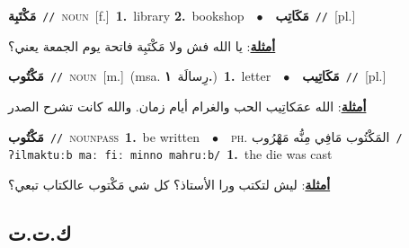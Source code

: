\documentclass[10pt,a4paper,twoside]{article} %
\begin{document}
\begin{multicols}{2}
{\setlength\topsep{0pt}\textbf{\foreignlanguage{arabic}{مَكْتَبِة}}\ {\color{gray}\texttt{//}\color{black}}\ \textsc{noun}\ [f.]\ \textbf{1.}~library  \textbf{2.}~bookshop\ \ $\bullet$\ \ \setlength\topsep{0pt}\textbf{\foreignlanguage{arabic}{مَكَاتِب}}\ {\color{gray}\texttt{//}\color{black}}\ [pl.]\  \begin{flushright}\color{gray}\foreignlanguage{arabic}{\textbf{\underline{\foreignlanguage{arabic}{أمثلة}}}: يا الله فش ولا مَكْتَبِة فاتحة يوم الجمعة يعني؟}\end{flushright}\color{black}} \vspace{2mm}

{\setlength\topsep{0pt}\textbf{\foreignlanguage{arabic}{مَكْتُوب}}\ {\color{gray}\texttt{//}\color{black}}\ \textsc{noun}\ [m.]\ \color{gray}(msa. \foreignlanguage{arabic}{رِسالَة}~\foreignlanguage{arabic}{\textbf{١.}})\color{black}\ \textbf{1.}~letter\ \ $\bullet$\ \ \setlength\topsep{0pt}\textbf{\foreignlanguage{arabic}{مَكَاتِيب}}\ {\color{gray}\texttt{//}\color{black}}\ [pl.]\  \begin{flushright}\color{gray}\foreignlanguage{arabic}{\textbf{\underline{\foreignlanguage{arabic}{أمثلة}}}: الله عمَكاتِيب الحب والغرام أيام زمان. والله كانت تشرح الصدر}\end{flushright}\color{black}} \vspace{2mm}

{\setlength\topsep{0pt}\textbf{\foreignlanguage{arabic}{مَكْتُوب}}\ {\color{gray}\texttt{//}\color{black}}\ \textsc{noun\textunderscore pass}\ \textbf{1.}~be written\ \ $\bullet$\ \ \textsc{ph.} \color{gray} \foreignlanguage{arabic}{المَكْتُوب مَافِي مِنُّه مَهْرُوب}\color{black}\ {\color{gray}\texttt{/{\sffamily ʔilmaktuːb maː fiː minno mahruːb}/}\color{black}}\ \textbf{1.}~the die was cast\  \begin{flushright}\color{gray}\foreignlanguage{arabic}{\textbf{\underline{\foreignlanguage{arabic}{أمثلة}}}: ليش لتكتب ورا الأستاذ؟ كل شي مَكْتوب عالكتاب تبعي؟}\end{flushright}\color{black}} \vspace{2mm}

\vspace{-3mm}
\subsection*{\color{blue}\foreignlanguage{arabic}{ك.ت.ت}\color{blue}{}} 


\end{multicols}
\end{document}
